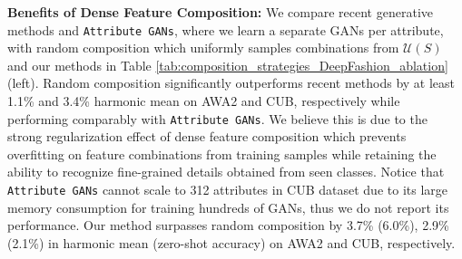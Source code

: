 \documentclass[10pt,journal,compsoc]{IEEEtran}
\newcommand{\1}{\boldsymbol{1}}
\newcommand{\0}{\boldsymbol{0}}
\newcommand{\U}{\mathcal{U}}
\newcommand{\<}{\langle}
\renewcommand{\>}{\rangle}
\newcommand{\myparagraph}[1]{\vspace{-2pt}\medskip\noindent\textbf{#1}}
\begin{document}
\begin{table}
\centering
{}
\caption{\small{Ablation study of dense attention mechanism without feature composition on the CUB and AWA2 datasets.}}
\label{tab:dense_att_ablation}
\end{table}


\myparagraph{Benefits of Dense Feature Composition:}
We compare recent generative methods and \texttt{Attribute GANs}, where we learn a separate GANs per attribute, with random composition which uniformly samples combinations from $\U(S)$
and our methods in Table \ref{tab:composition_strategies_DeepFashion_ablation} (left).
Random composition significantly outperforms recent methods by at least 1.1\% and 3.4\% harmonic mean on AWA2 and CUB, respectively while performing comparably with \texttt{Attribute GANs}.
We believe this is due to the strong regularization effect of dense feature composition which prevents overfitting on feature combinations from training samples while retaining the ability to recognize fine-grained details obtained from seen classes.
Notice that \texttt{Attribute GANs} cannot scale to 312 attributes in CUB dataset due to its large memory consumption for training hundreds of GANs, thus we do not report its performance.
Our method surpasses random composition by 3.7\% (6.0\%), 2.9\% (2.1\%) in harmonic mean (zero-shot accuracy) on AWA2 and CUB, respectively.
\end{document}
